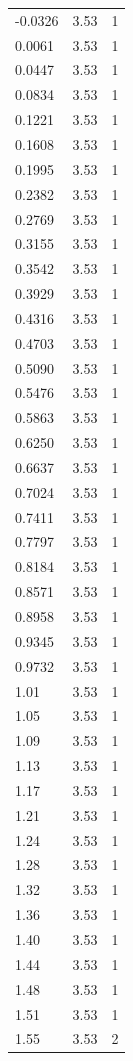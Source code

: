 \begin{longtable}{lrr}
  -0.0326 & 3.53 & 1 \\
  0.0061 & 3.53 & 1 \\
  0.0447 & 3.53 & 1 \\
  0.0834 & 3.53 & 1 \\
  0.1221 & 3.53 & 1 \\
  0.1608 & 3.53 & 1 \\
  0.1995 & 3.53 & 1 \\
  0.2382 & 3.53 & 1 \\
  0.2769 & 3.53 & 1 \\
  0.3155 & 3.53 & 1 \\
  0.3542 & 3.53 & 1 \\
  0.3929 & 3.53 & 1 \\
  0.4316 & 3.53 & 1 \\
  0.4703 & 3.53 & 1 \\
  0.5090 & 3.53 & 1 \\
  0.5476 & 3.53 & 1 \\
  0.5863 & 3.53 & 1 \\
  0.6250 & 3.53 & 1 \\
  0.6637 & 3.53 & 1 \\
  0.7024 & 3.53 & 1 \\
  0.7411 & 3.53 & 1 \\
  0.7797 & 3.53 & 1 \\
  0.8184 & 3.53 & 1 \\
  0.8571 & 3.53 & 1 \\
  0.8958 & 3.53 & 1 \\
  0.9345 & 3.53 & 1 \\
  0.9732 & 3.53 & 1 \\
  1.01 & 3.53 & 1 \\
  1.05 & 3.53 & 1 \\
  1.09 & 3.53 & 1 \\
  1.13 & 3.53 & 1 \\
  1.17 & 3.53 & 1 \\
  1.21 & 3.53 & 1 \\
  1.24 & 3.53 & 1 \\
  1.28 & 3.53 & 1 \\
  1.32 & 3.53 & 1 \\
  1.36 & 3.53 & 1 \\
  1.40 & 3.53 & 1 \\
  1.44 & 3.53 & 1 \\
  1.48 & 3.53 & 1 \\
  1.51 & 3.53 & 1 \\
  1.55 & 3.53 & 2 \\

\end{longtable}
